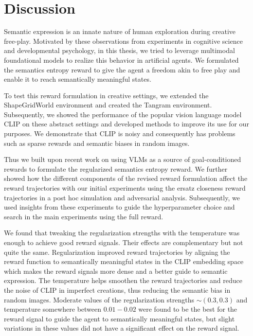 \chapter{Discussion}
\label{sec:discussion}

Semantic expression is an innate nature of human exploration during creative free-play.
Motivated by these observations from experiments in cognitive science and developmental psychology, in this thesis, we tried to leverage multimodal foundational models to realize this behavior in artificial agents.
We formulated the semantics entropy reward to give the agent a freedom akin to free play and enable it to reach semantically meaningful states.

To test this reward formulation in creative settings, we extended the ShapeGridWorld environment and created the Tangram environment.
Subsequently, we showed the performance of the popular vision language model CLIP on these abstract settings and developed methods to improve its use for our purposes.
We demonstrate that CLIP is noisy and consequently has problems such as sparse rewards and semantic biases in random images.

Thus we built upon recent work on using VLMs as a source of goal-conditioned rewards to formulate the regularized semantics entropy reward.
We further showed how the different components of the revised reward formulation affect the reward trajectories with our initial experiments using the ersatz closeness reward trajectories in a post hoc simulation and adversarial analysis.
Subsequently, we used insights from these experiments to guide the hyperparameter choice and search in the main experiments using the full reward.

We found that tweaking the regularization strengths with the temperature was enough to achieve good reward signals.
Their effects are complementary but not quite the same.
Regularization improved reward trajectories by aligning the reward function to semantically meaningful states in the CLIP embedding space which makes the reward signals more dense and a better guide to semantic expression.
The temperature helps smoothen the reward trajectories and reduce the noise of CLIP in imperfect creations, thus reducing the semantic bias in random images.
Moderate values of the regularization strengths \(\sim (0.3, 0.3)\) and temperature somewhere between \(0.01 - 0.02\)  were found to be the best for the reward signal to guide the agent to semantically meaningful states, but slight variations in these values did not have a significant effect on the reward signal.

